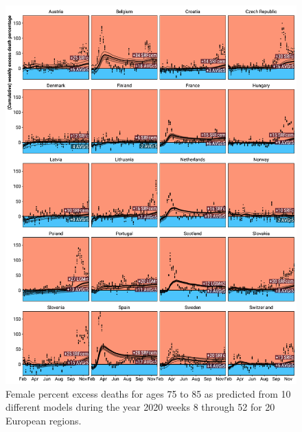 \documentclass[12pt]{article}
\begin{document}
\begin{appendix}
\begin{figure}
\caption{
Female percent excess deaths for ages 75 to 85 as predicted from 10 different models during the year 2020 weeks 8 through 52 for 20 European regions.}
\label{fig:excessf75to85}
\includegraphics{excess_female__75_85_.pdf}
\end{figure}


\end{appendix}
\end{document}

